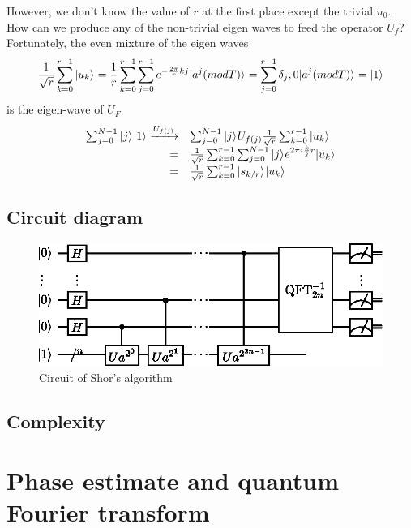 \documentclass[oneside, letter, 12pt]{book}
\begin{document}
However, we don't know the value of $r$ at the first place except the trivial $u_0$. How can we produce any of the non-trivial eigen waves to feed the operator $U_f$? Fortunately, the even mixture of the eigen waves
\begin{equation}\label{sum_u}
    \frac 1 {\sqrt{r}} \sum^{r-1}_{k=0}\vert {u_k} \rangle_{} = \frac 1 r \sum^{r-1}_{k=0} \sum^{r-1}_{j=0} e^{-{\frac {2\pi} r} kj} \vert {a^j (mod T)} \rangle_{} = \sum^{r-1}_{j=0} \delta_j,0 \vert {a^j (mod T)} \rangle_{} = \vert {1} \rangle_{}
\end{equation}
is the eigen-wave of $U_F$
\begin{equation}\label{ctrl_u}
\begin{array}{rl}
 \sum^{N-1}_{j=0} \vert {j} \rangle_{} \vert {1} \rangle_{} \xrightarrow{U_{f(j)}} & \sum^{N-1}_{j=0} \vert {j} \rangle_{} U_{f(j)} \frac 1 {\sqrt{r}} \sum^{r-1}_{k=0}\vert {u_k} \rangle_{}\\
    = & \frac 1 {\sqrt{r}} \sum^{r-1}_{k=0} \sum^{N-1}_{j=0} \vert {j} \rangle_{} e^{2\pi i \frac kj r} \vert {u_k} \rangle_{}\\
    = & \frac 1 {\sqrt{r}} \sum^{r-1}_{k=0} \vert {s_{k/r}} \rangle_{} \vert {u_k} \rangle_{}
\end{array}
\end{equation}

\subsection{Circuit diagram}
\begin{figure}[h]
\includegraphics[width=12cm]{pic/Shor_algorithm.eps}
\caption{Circuit of Shor's algorithm}
\label{ShorAlgorithm}
\end{figure}

\subsection{Complexity}

\section{Phase estimate and quantum Fourier transform}
\end{document}
